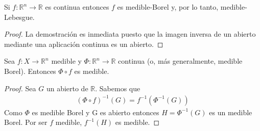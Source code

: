 \begin{prop}
    Si $f: \mathbb{R}^n \longrightarrow \mathbb{R}$ es continua entonces $f$ es medible-Borel y, por lo tanto, medible-Lebesgue.
\end{prop}
\begin{proof}
    La demostración es inmediata puesto que la imagen inversa de un abierto mediante una aplicación continua es un abierto.
\end{proof}

\begin{prop}
    \label{prop:comp}
    Sea $f: X \longrightarrow \mathbb{R}^n$ medible y $\Phi: \mathbb{R}^n \longrightarrow \mathbb{R}$ continua (o, más generalmente, medible Borel). Entonces $\Phi \circ{} f$ es medible.
\end{prop}

\begin{proof}
    Sea $G$ un abierto de $\mathbb{R}$. Sabemos que
    \begin{align*}
        (\Phi \circ{} f)^{-1}(G) = f^{-1}(\Phi^{-1}(G))
    \end{align*}
    Como $\Phi$ es medible Borel y G es abierto entonces $H = \Phi^{-1}(G)$ es un medible Borel. Por ser $f$ medible, $f^{-1}(H)$ es medible.
\end{proof}

